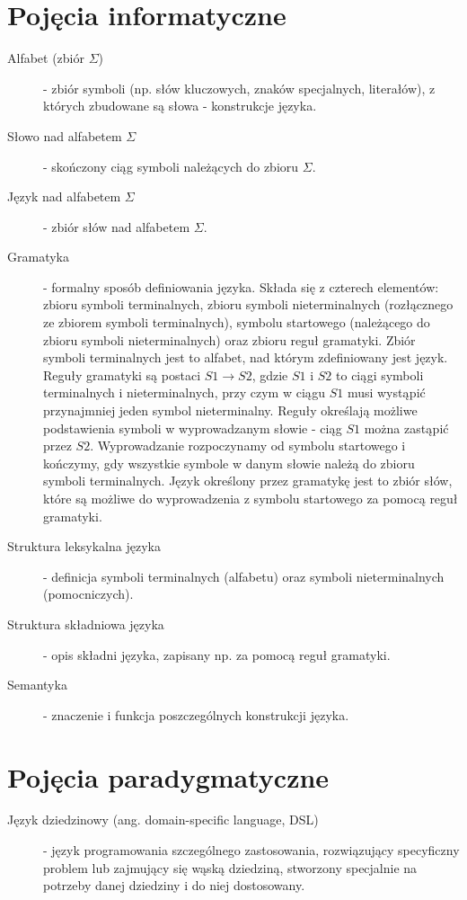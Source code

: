 \section{Pojęcia informatyczne}
\begin{description}
 \item[Alfabet (zbiór $\Sigma$)] - zbiór symboli (np. słów kluczowych, znaków specjalnych, literałów), z których zbudowane są słowa - konstrukcje języka.
 \item[Słowo nad alfabetem $\Sigma$] - skończony ciąg symboli należących do zbioru $\Sigma $.
 \item[Język nad alfabetem $\Sigma$] - zbiór słów nad alfabetem $\Sigma $.
 \item[Gramatyka] - formalny sposób definiowania języka. Składa się z czterech elementów: zbioru symboli terminalnych, zbioru symboli nieterminalnych (rozłącznego ze zbiorem symboli terminalnych), symbolu startowego (należącego do zbioru symboli nieterminalnych) oraz zbioru reguł gramatyki. Zbiór symboli terminalnych jest to alfabet, nad którym zdefiniowany jest język. Reguły gramatyki są postaci $S1 \rightarrow S2$, gdzie $S1$ i $S2$ to ciągi symboli terminalnych i nieterminalnych, przy czym w ciągu $S1$ musi wystąpić przynajmniej jeden symbol nieterminalny. Reguły określają możliwe podstawienia symboli w wyprowadzanym słowie - ciąg $S1$ można zastąpić przez $S2$. Wyprowadzanie rozpoczynamy od symbolu startowego i kończymy, gdy wszystkie symbole w danym słowie należą do zbioru symboli terminalnych. Język określony przez gramatykę jest to zbiór słów, które są możliwe do wyprowadzenia z symbolu startowego za pomocą reguł gramatyki.
 \item[Struktura leksykalna języka] - definicja symboli terminalnych (alfabetu) oraz symboli nieterminalnych (pomocniczych).
 \item[Struktura składniowa języka] - opis składni języka, zapisany np. za pomocą reguł gramatyki.
 \item[Semantyka] - znaczenie i funkcja poszczególnych konstrukcji języka.
 \end{description}
\section{Pojęcia paradygmatyczne}
\begin{description}
 \item[Język dziedzinowy (ang. domain-specific language, DSL)] - język programowania szczególnego zastosowania, rozwiązujący specyficzny problem lub zajmujący się wąską dziedziną, stworzony specjalnie na potrzeby danej dziedziny i do niej dostosowany.
 
 \end{description}